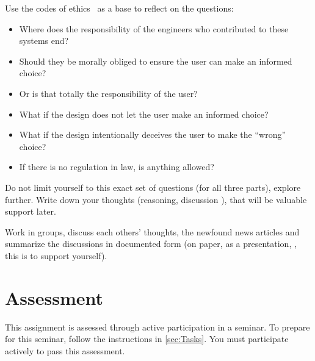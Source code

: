 Use the codes of ethics~\cite{acmcode,acmsecode,ieeecode} as a base to reflect 
on the questions:
\begin{frame}
\begin{itemize}
  \item Where does the responsibility of the engineers who contributed to these 
    systems end?
  \item Should they be morally obliged to ensure the user can make an informed 
    choice?
  \item Or is that totally the responsibility of the user?
  \item What if the design does not let the user make an informed choice?
  \item What if the design intentionally deceives the user to make the 
    \enquote{wrong} choice?
  \item If there is no regulation in law, is anything allowed?
\end{itemize}
\end{frame}

Do not limit yourself to this exact set of questions (for all three parts), 
explore further.
Write down your thoughts (reasoning, discussion \etc), that will be valuable 
support later.

Work in groups, discuss each others' thoughts, the newfound news articles and 
summarize the discussions in documented form (on paper, as a presentation, 
\etc, this is to support yourself).


\section{Assessment}%
\label{Assessment}

This assignment is assessed through active participation in a seminar.
To prepare for this seminar, follow the instructions in \cref{sec:Tasks}.
You must participate actively to pass this assessment.

